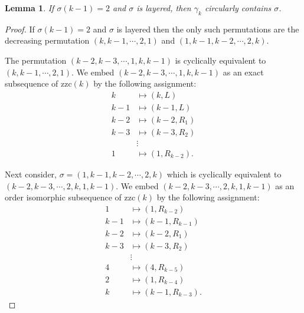\documentclass[a4paper,12pt]{article}
\newtheorem{lemma}[theorem]{Lemma}
\theoremstyle{definition}
\numberwithin{equation}{section}
\begin{document}
\begin{lemma}\label{layered2}
    If $\sigma(k-1) = 2$ and $\sigma$ is layered, then $\gamma_k$ circularly contains $\sigma$.
\end{lemma}
\begin{proof}
If $\sigma(k-1) = 2$ and $\sigma$ is layered then the only such permutations are the decreasing permutation $(k,k-1,\cdots,2,1)$ and $(1,k-1,k-2,\cdots, 2,k)$.\par
The permutation $(k-2,k-3,\cdots,1,k,k-1)$ is cyclically equivalent to $(k,k-1,\cdots,2,1)$. We embed $(k-2,k-3,\cdots,1,k,k-1)$ as an exact subsequence of $\mathrm{zzc}(k)$ by the following assignment: 
\begin{align*}
    k  &\mapsto (k,L) \\
    k-1 &\mapsto (k-1,L) \\
    k-2 &\mapsto (k-2,R_1) \\
    k-3 &\mapsto (k-3,R_2) \\
    &\vdots \\
    1 &\mapsto (1,R_{k-2}).
\end{align*}
\par
Next consider, $\sigma=(1,k-1,k-2,\cdots, 2,k)$ which is cyclically equivalent to $(k-2,k-3,\cdots,2,k,1,k-1)$. We embed $(k-2,k-3,\cdots,2,k,1,k-1)$ as an order isomorphic subsequence of $\mathrm{zzc}(k)$ by the following assignment: 
\begin{align*}
    1 &\mapsto (1,R_{k-2}) \\
    k-1 &\mapsto (k-1,R_{k-1}) \\
    k-2 &\mapsto (k-2,R_1) \\
    k-3 &\mapsto (k-3,R_2) \\
    &\vdots \\
    4 &\mapsto (4, R_{k-5}) \\
    2 &\mapsto (1 ,R_{k-4}) \\
    k &\mapsto (k-1,R_{k-3}).
\end{align*}

\end{proof}
\end{document}
